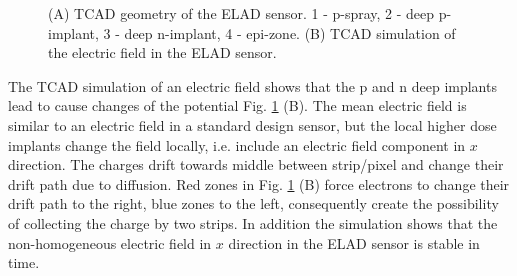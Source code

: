\begin{figure}[H]
\begin{minipage}[h]{0.5\linewidth}
\end{minipage}
\hfill 
\begin{minipage}[h]{0.5\linewidth}
\end{minipage}
\caption[short description here]
 {(A) TCAD geometry of the ELAD sensor. 1 - p-spray, 2 - deep p-implant, 3 - deep n-implant, 4 - epi-zone. 
 (B) TCAD simulation of the electric field in the ELAD sensor. 
 }
\label{fig:geo-elfield}
\end{figure}

The TCAD simulation of an electric field shows that the p and n deep implants lead to cause changes of the potential Fig. \ref{fig:geo-elfield} (B). 
The mean electric field is similar to an electric field in a standard design sensor, but the local higher dose implants change the field locally, i.e. include an electric field component in $x$ direction. 
The charges drift towards middle between strip/pixel and change their drift path due to diffusion.
Red zones in Fig. \ref{fig:geo-elfield} (B) force electrons to change their drift path to the right, blue zones to the left, consequently create the possibility of collecting the charge by two strips. 
In addition the simulation shows that the non-homogeneous electric field in $x$ direction in the ELAD sensor is stable in time. 

